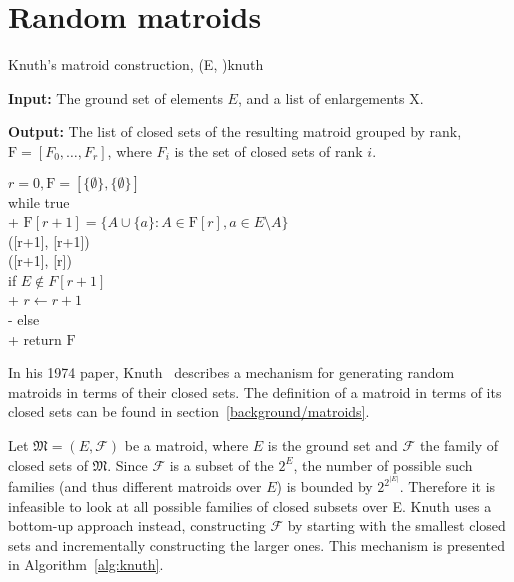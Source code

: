 \section{Random matroids}\label{random-matroids}
\begin{algorithm}[float*=ht,width=\textwidth]{Knuth's matroid construction, (E, )}{knuth}

  \textbf{Input:} The ground set of elements $E$, and a list of enlargements $\mathrm{X}$.

  \textbf{Output:} The list of closed sets of the resulting matroid grouped by rank, $\mathrm{F} = [F_0, \ldots, F_r]$, where $F_i$ is the set of closed sets of rank $i$.

  \begin{pseudo}[label=\small\arabic*, indent-mark, line-height=1.1]
    $r = 0, \mathrm{F} = [\{ \emptyset \}, \{ \emptyset \}]$ \\
    while true  \\+
    $\mathrm{F}[r+1] = \{ A \cup \{a\} : A \in \mathrm{F}[r], a \in E \setminus A \}$\\
    ([r+1], [r+1]) \\
    ([r+1], [r]) \\

    if $E \not \in F[r+1]$ \\+
    $r \leftarrow r+1$ \\-
    else \\+
    return $\mathrm{F}$

  \end{pseudo}

\end{algorithm}

In his 1974 paper, Knuth \cite{knuth-1975} describes a mechanism for generating random matroids in terms of their closed sets. The definition of a matroid in terms of its closed sets can be found in section \ref{background/matroids}.

Let $\mathfrak{M} = (E, \mathcal{F})$ be a matroid, where $E$ is the ground set and $\mathcal{F}$ the family of closed sets of $\mathfrak{M}$. Since $\mathcal{F}$ is a subset of the $2^E$, the number of possible such families (and thus different matroids over $E$) is bounded by $2^{2^{|E|}}$. Therefore it is infeasible to look at all possible families of closed subsets over E. Knuth uses a bottom-up approach instead, constructing $\mathcal{F}$ by starting with the smallest closed sets and incrementally constructing the larger ones. This mechanism is presented in Algorithm \ref{alg:knuth}.


